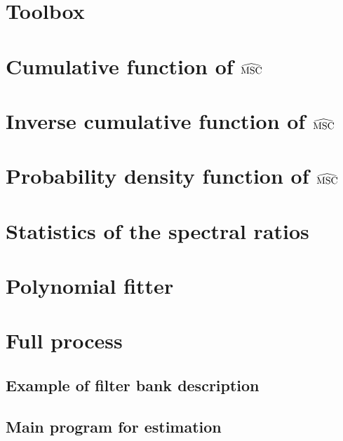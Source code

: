 \section{Toolbox}
\label{s:toolbox}
{\tiny }

\section{Cumulative function of $\widehat{\mathrm{MSC}}$}
{\tiny 

\section{Inverse cumulative function of $\widehat{\mathrm{MSC}}$}
{\tiny 

\section{Probability density function of $\widehat{\mathrm{MSC}}$}
{\tiny 

 \section{Statistics of the spectral ratios}
{\tiny 

 \section{Polynomial fitter}
{\tiny 

 \section{Full process}

 \subsection{Example of filter bank description}
{\tiny }

 \clearpage
\subsection{Main program for estimation}
{\tiny }


}}}}}
